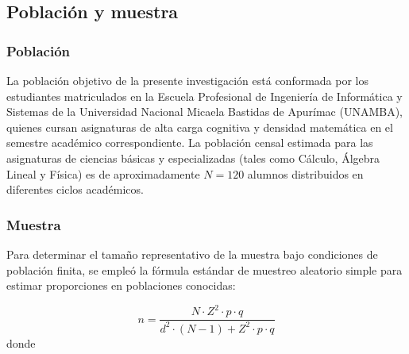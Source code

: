 \begin{table}[H]
\end{table}

\subsection{Población y muestra}

\subsubsection{Población}
La población objetivo de la presente investigación está conformada por los estudiantes matriculados en la Escuela Profesional de Ingeniería de Informática y Sistemas de la Universidad Nacional Micaela Bastidas de Apurímac (UNAMBA), quienes cursan asignaturas de alta carga cognitiva y densidad matemática en el semestre académico correspondiente. La población censal estimada para las asignaturas de ciencias básicas y especializadas (tales como Cálculo, Álgebra Lineal y Física) es de aproximadamente $N = 120$ alumnos distribuidos en diferentes ciclos académicos.

\subsubsection{Muestra}
Para determinar el tamaño representativo de la muestra bajo condiciones de población finita, se empleó la fórmula estándar de muestreo aleatorio simple para estimar proporciones en poblaciones conocidas:

\begin{equation}
n = \frac{N \cdot Z^2 \cdot p \cdot q}{d^2 \cdot (N - 1) + Z^2 \cdot p \cdot q}
\end{equation}
\noindent donde


